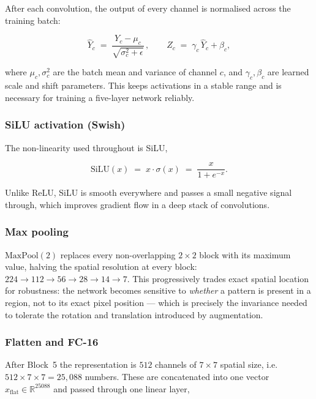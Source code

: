 \documentclass[11pt]{article}
\begin{document}
After each convolution, the output of every channel is normalised across the training
batch:

\begin{equation}
\hat{Y}_c \;=\; \frac{Y_c - \mu_c}{\sqrt{\sigma_c^2 + \epsilon}}\,, \qquad
Z_c \;=\; \gamma_c\,\hat{Y}_c + \beta_c ,
\end{equation}

where $\mu_c, \sigma_c^2$ are the batch mean and variance of channel $c$, and $\gamma_c,
\beta_c$ are learned scale and shift parameters. This keeps activations in a stable range
and is necessary for training a five-layer network reliably.

\subsubsection{SiLU activation (Swish)}

The non-linearity used throughout is SiLU,

\begin{equation}
\mathrm{SiLU}(x) \;=\; x \cdot \sigma(x) \;=\; \frac{x}{1+e^{-x}} .
\end{equation}

Unlike ReLU, SiLU is smooth everywhere and passes a small negative signal through, which
improves gradient flow in a deep stack of convolutions.

\subsubsection{Max pooling}

$\mathrm{MaxPool}(2)$ replaces every non-overlapping $2\times2$ block with its maximum
value, halving the spatial resolution at every block:
$224 \to 112 \to 56 \to 28 \to 14 \to 7$. This progressively trades exact spatial location for
robustness: the network becomes sensitive to \emph{whether} a pattern is present in a
region, not to its exact pixel position --- which is precisely the invariance needed to
tolerate the rotation and translation introduced by augmentation.

\subsubsection{Flatten and FC-16}

After Block~5 the representation is $512$ channels of $7\times7$ spatial size, i.e.\
$512\times7\times7 = 25{,}088$ numbers. These are concatenated into one vector $x_{\text{flat}}
\in \mathbb{R}^{25088}$ and passed through one linear layer,
\end{document}
